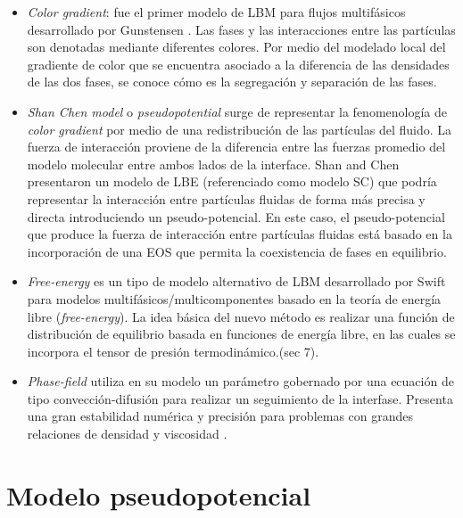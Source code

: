 \begin{itemize}
	
	\item \textit{Color gradient}: fue el primer modelo de LBM para flujos multifásicos desarrollado por Gunstensen \cite{gunstensen1991lattice}. Las fases y las interacciones entre las partículas son denotadas mediante diferentes colores. Por medio del modelado local del gradiente de color que se encuentra asociado a la diferencia de las densidades de las dos fases, se conoce cómo es la segregación y separación de las fases.
	
	\item \textit{Shan Chen model} o \textit{pseudopotential} surge de representar la fenomenología de \textit{color gradient} por medio de una redistribución de las partículas del fluido. La fuerza de interacción proviene de la diferencia entre las fuerzas promedio del modelo molecular  entre ambos lados de la interface. Shan and Chen \cite{shan1993lattice} presentaron un modelo de LBE (referenciado como modelo SC) que podría representar la interacción entre partículas fluidas de forma más precisa y directa introduciendo un pseudo-potencial. En este caso, el pseudo-potencial que produce la fuerza de interacción entre partículas fluidas está basado en la incorporación de una EOS que permita la coexistencia de fases en equilibrio.
	
	\item \textit{Free-energy} es un tipo de modelo alternativo de LBM desarrollado por Swift \cite{swift1995lattice} para modelos multifásicos/multicomponentes basado en la teoría de energía libre (\textit{free-energy}). La idea básica del nuevo método es realizar una función de distribución de equilibrio basada en funciones de energía libre, en las cuales se incorpora el tensor de presión termodinámico.\cite{guo2013lattice}(sec 7).
	
	\item \textit{Phase-field} utiliza en su modelo un parámetro gobernado por una ecuación de tipo convección-difusión para realizar un seguimiento de la interfase. Presenta una gran estabilidad numérica y precisión para problemas con grandes relaciones de densidad y viscosidad \cite{wang2019brief}.
	
	
\end{itemize}





\section{Modelo pseudopotencial}

